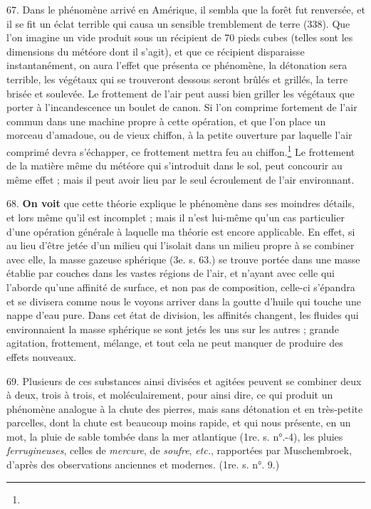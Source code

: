 \documentclass[a4paper, 11pt, oneside, polutonikogreek, french]{article}
\begin{document}
67. Dans le phénomène arrivé en Amérique, il sembla que la forêt fut renversée, et il se fit un éclat terrible qui causa un sensible tremblement de terre (338). Que l'on imagine un vide produit sous un récipient de 70 pieds cubes (telles sont les dimensions du météore dont il s'agit), et que ce récipient disparaisse instantanément, on aura l'effet que présenta ce phénomène, la détonation sera terrible, les végétaux qui se trouveront dessous seront brûlés et grillés, la terre brisée et soulevée. Le frottement de l'air peut aussi bien griller les végétaux que porter à l'incandescence un boulet de canon. Si l'on comprime fortement de l'air commun dans une machine propre à cette opération, et que l'on place un morceau d'amadoue, ou de vieux chiffon, à la petite ouverture par laquelle l'air comprimé devra s'échapper, ce frottement mettra feu au chiffon.\footnote{} Le frottement de la matière même du météore qui s'introduit dans le sol, peut concourir au même effet ; mais il peut avoir lieu par le seul écroulement de l'air environnant.

68. \textbf{On voit} que cette théorie explique le phénomène dans ses moindres détails, et lors même qu'il est incomplet ; mais il n'est lui-même qu'un cas particulier d'une opération générale à laquelle ma théorie est encore applicable. En effet, si au lieu d'être jetée d'un milieu qui l'isolait dans un milieu propre à se combiner avec elle, la masse gazeuse sphérique (3e. s. 63.) se trouve portée dans une masse établie par couches dans les vastes régions de l'air, et n'ayant avec celle qui l'aborde qu'une affinité de surface, et non pas de composition, celle-ci s'épandra et se divisera comme nous le voyons arriver dans la goutte d'huile qui touche une nappe d'eau pure. Dans cet état de division, les affinités changent, les fluides qui environnaient la masse sphérique se sont jetés les uns sur les autres ; grande agitation, frottement, mélange, et tout cela ne peut manquer de produire des effets nouveaux.

69. Plusieurs de ces substances ainsi divisées et agitées peuvent se combiner deux à deux, trois à trois, et moléculairement, pour ainsi dire, ce qui produit un phénomène analogue à la chute des pierres, mais sans détonation et en très-petite parcelles, dont la chute est beaucoup moins rapide, et qui nous présente, en un mot, la pluie de sable tombée dans la mer atlantique (1re. s. n°.-4), les pluies \emph{ferrugineuses}, celles de \emph{mercure}, de \emph{soufre}, \emph{etc.}, rapportées par Muschembroek, d'après des observations anciennes et modernes. (1re. s. n°. 9.)
\end{document}
